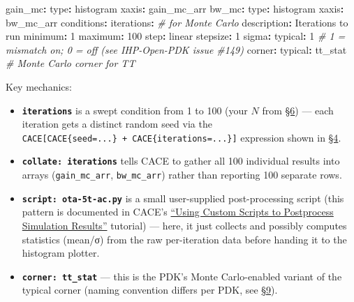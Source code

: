 \documentclass[
]{article}
\newenvironment{Shaded}{}{}
\newcommand{\AttributeTok}[1]{\textcolor[rgb]{0.49,0.56,0.16}{#1}}
\newcommand{\CommentTok}[1]{\textcolor[rgb]{0.38,0.63,0.69}{\textit{#1}}}
\newcommand{\DecValTok}[1]{\textcolor[rgb]{0.25,0.63,0.44}{#1}}
\newcommand{\FunctionTok}[1]{\textcolor[rgb]{0.02,0.16,0.49}{#1}}
\newcommand{\KeywordTok}[1]{\textcolor[rgb]{0.00,0.44,0.13}{\textbf{#1}}}
\providecommand{\tightlist}{%
  \setlength{\itemsep}{0pt}\setlength{\parskip}{0pt}}
\begin{document}
\begin{Shaded}
\begin{Highlighting}[]
\AttributeTok{    }\FunctionTok{gain\_mc}\KeywordTok{:}
\AttributeTok{      }\FunctionTok{type}\KeywordTok{:}\AttributeTok{ histogram}
\AttributeTok{      }\FunctionTok{xaxis}\KeywordTok{:}\AttributeTok{ gain\_mc\_arr}
\AttributeTok{    }\FunctionTok{bw\_mc}\KeywordTok{:}
\AttributeTok{      }\FunctionTok{type}\KeywordTok{:}\AttributeTok{ histogram}
\AttributeTok{      }\FunctionTok{xaxis}\KeywordTok{:}\AttributeTok{ bw\_mc\_arr}
\AttributeTok{  }\FunctionTok{conditions}\KeywordTok{:}
\AttributeTok{    }\FunctionTok{iterations}\KeywordTok{:}\CommentTok{               \# for Monte Carlo}
\AttributeTok{      }\FunctionTok{description}\KeywordTok{:}\AttributeTok{ Iterations to run}
\AttributeTok{      }\FunctionTok{minimum}\KeywordTok{:}\AttributeTok{ }\DecValTok{1}
\AttributeTok{      }\FunctionTok{maximum}\KeywordTok{:}\AttributeTok{ }\DecValTok{100}
\AttributeTok{      }\FunctionTok{step}\KeywordTok{:}\AttributeTok{ linear}
\AttributeTok{      }\FunctionTok{stepsize}\KeywordTok{:}\AttributeTok{ }\DecValTok{1}
\AttributeTok{    }\FunctionTok{sigma}\KeywordTok{:}
\AttributeTok{      }\FunctionTok{typical}\KeywordTok{:}\AttributeTok{ }\DecValTok{1}\CommentTok{              \# 1 = mismatch on; 0 = off (see IHP{-}Open{-}PDK issue \#149)}
\AttributeTok{    }\FunctionTok{corner}\KeywordTok{:}
\AttributeTok{      }\FunctionTok{typical}\KeywordTok{:}\AttributeTok{ tt\_stat}\CommentTok{         \# Monte Carlo corner for TT}
\end{Highlighting}
\end{Shaded}

Key mechanics:

\begin{itemize}
\tightlist
\item
  \textbf{\texttt{iterations}} is a swept condition from 1 to 100 (your
  \(N\) from \protect\hyperlink{6-pvt-corner-sweeps}{§6}) --- each
  iteration gets a distinct random seed via the
  \texttt{CACE{[}CACE\{seed=...\}\ +\ CACE\{iterations=...\}{]}}
  expression shown in
  \protect\hyperlink{4-testbench-templates-and-token-substitution}{§4}.
\item
  \textbf{\texttt{collate:\ iterations}} tells CACE to gather all 100
  individual results into arrays (\texttt{gain\_mc\_arr},
  \texttt{bw\_mc\_arr}) rather than reporting 100 separate rows.
\item
  \textbf{\texttt{script:\ ota-5t-ac.py}} is a small user-supplied
  post-processing script (this pattern is documented in CACE's
  \href{https://cace.readthedocs.io/en/latest/tutorials/custom_scripts.html}{``Using
  Custom Scripts to Postprocess Simulation Results''} tutorial) ---
  here, it just collects and possibly computes statistics (mean/σ) from
  the raw per-iteration data before handing it to the histogram plotter.
\item
  \textbf{\texttt{corner:\ tt\_stat}} --- this is the PDK's Monte
  Carlo-enabled variant of the typical corner (naming convention differs
  per PDK, see
  \protect\hyperlink{9-per-pdk-adaptation-sg13g2cmos5l-gf180mcu-sky130}{§9}).
\end{itemize}
\end{document}
